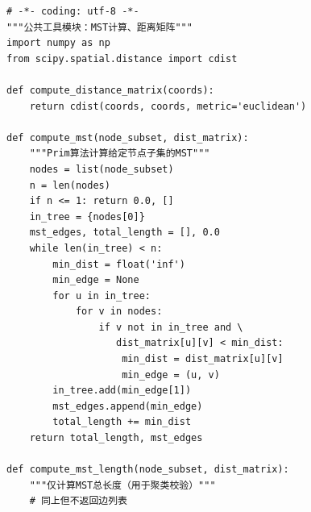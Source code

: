 \documentclass[12pt,a4paper]{ctexart}
\theoremstyle{definition}
\theoremstyle{plain}
\theoremstyle{remark}
\begin{document}
\begin{lstlisting}[caption={\texttt{utils.py}：距离矩阵与最小生成树工具}]
# -*- coding: utf-8 -*-
"""公共工具模块：MST计算、距离矩阵"""
import numpy as np
from scipy.spatial.distance import cdist

def compute_distance_matrix(coords):
    return cdist(coords, coords, metric='euclidean')

def compute_mst(node_subset, dist_matrix):
    """Prim算法计算给定节点子集的MST"""
    nodes = list(node_subset)
    n = len(nodes)
    if n <= 1: return 0.0, []
    in_tree = {nodes[0]}
    mst_edges, total_length = [], 0.0
    while len(in_tree) < n:
        min_dist = float('inf')
        min_edge = None
        for u in in_tree:
            for v in nodes:
                if v not in in_tree and \
                   dist_matrix[u][v] < min_dist:
                    min_dist = dist_matrix[u][v]
                    min_edge = (u, v)
        in_tree.add(min_edge[1])
        mst_edges.append(min_edge)
        total_length += min_dist
    return total_length, mst_edges

def compute_mst_length(node_subset, dist_matrix):
    """仅计算MST总长度（用于聚类校验）"""
    # 同上但不返回边列表
\end{lstlisting}
\end{document}
